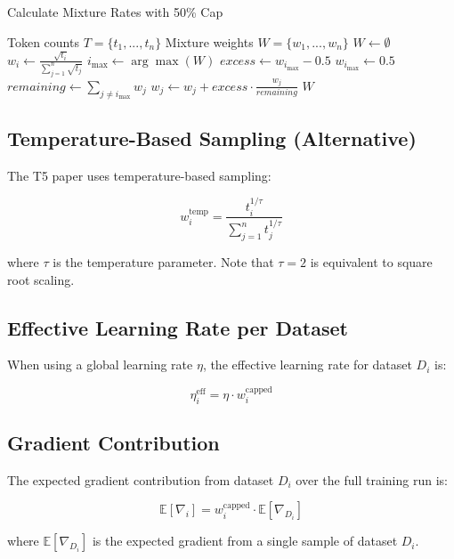 \documentclass{article}
\begin{document}
\begin{algorithm}
\caption{Calculate Mixture Rates with 50\% Cap}
\begin{algorithmic}[1]
\REQUIRE Token counts $T = \{t_1, ..., t_n\}$
\ENSURE Mixture weights $W = \{w_1, ..., w_n\}$
\STATE $W \leftarrow \emptyset$
    \STATE $w_i \leftarrow \frac{\sqrt{t_i}}{\sum_{j=1}^{n} \sqrt{t_j}}$
\ENDFOR
{}
    \STATE $i_{\max} \leftarrow \arg\max(W)$
    \STATE $excess \leftarrow w_{i_{\max}} - 0.5$
    \STATE $w_{i_{\max}} \leftarrow 0.5$
    \STATE $remaining \leftarrow \sum_{j \neq i_{\max}} w_j$
        \STATE $w_j \leftarrow w_j + excess \cdot \frac{w_j}{remaining}$
    \ENDFOR
\ENDIF
\RETURN $W$
\end{algorithmic}
\end{algorithm}

\subsection{Temperature-Based Sampling (Alternative)}

The T5 paper uses temperature-based sampling:

\begin{equation}
w_i^{\text{temp}} = \frac{t_i^{1/\tau}}{\sum_{j=1}^{n} t_j^{1/\tau}}
\end{equation}

where $\tau$ is the temperature parameter. Note that $\tau = 2$ is equivalent to square root scaling.

\subsection{Effective Learning Rate per Dataset}

When using a global learning rate $\eta$, the effective learning rate for dataset $D_i$ is:

\begin{equation}
\eta_i^{\text{eff}} = \eta \cdot w_i^{\text{capped}}
\end{equation}

\subsection{Gradient Contribution}

The expected gradient contribution from dataset $D_i$ over the full training run is:

\begin{equation}
\mathbb{E}[\nabla_i] = w_i^{\text{capped}} \cdot \mathbb{E}[\nabla_{D_i}]
\end{equation}

where $\mathbb{E}[\nabla_{D_i}]$ is the expected gradient from a single sample of dataset $D_i$.
\end{document}

